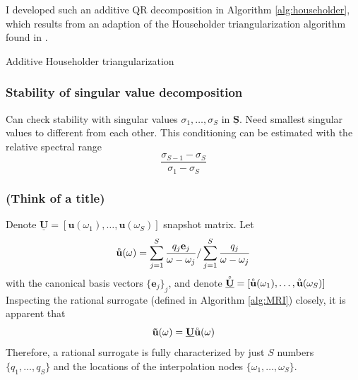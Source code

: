 \documentclass[11pt, a4paper]{article}
\begin{document}
I developed such an additive QR decomposition in Algorithm \ref{alg:householder},
which results from an adaption of the Householder triangularization algorithm
found in \citep{householder}.

\begin{algorithm}
    \caption{Additive Householder triangularization} \label{alg:householder}
    
\end{algorithm}


\subsubsection{Stability of singular value decomposition}
\label{subsubsec:svd}
Can check stability with singular values $\sigma_1, \dots, \sigma_S$ in 
$\mathbf{\underline{S}}$. Need smallest singular values
to different from each other. This conditioning can be estimated with the relative
spectral range \cite{davidePHD}
\begin{equation}
    \frac{\sigma_{S-1} - \sigma_S}{\sigma_1 - \sigma_S}
\end{equation}

\subsubsection{(Think of a title)}
\label{subsubsec:u-ring}
Denote $\mathbf{\underline{U}} = [\mathbf{u}(\omega_1), \dots, \mathbf{u}(\omega_S)]$
snapshot matrix.
Let 
\begin{equation}
    \accentset{\circ}{\mathbf{u}}(\omega) = \sum_{j=1}^S \frac{q_j \mathbf{e}_j}{\omega - \omega_j}
    / \sum_{j=1}^S \frac{q_j}{\omega - \omega_j} \label{equ:u-ring}
\end{equation}
with the canonical basis vectors $\{ \mathbf{e}_j \}_j$, and denote
$\accentset{\circ}{\mathbf{\underline{U}}} = [\accentset{\circ}{\mathbf{u}}(\omega_1), \dots, \accentset{\circ}{\mathbf{u}}(\omega_S)]$
Inspecting the rational surrogate (defined in Algorithm \ref{alg:MRI}) closely,
it is apparent that 
\begin{equation}
    \mathbf{\tilde{u}}(\omega) = \mathbf{\underline{U}} \accentset{\circ}{\mathbf{u}}(\omega)
\end{equation}
Therefore, a rational surrogate is fully characterized by just $S$ numbers $\{q_1, \dots, q_S\}$
and the locations of the interpolation nodes $\{\omega_1, \dots, \omega_S\}$.
\end{document}
